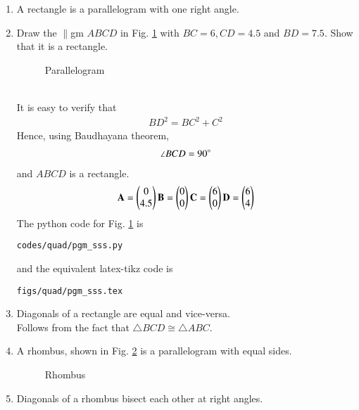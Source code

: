 \begin{enumerate}[label=\arabic*.,ref=\thesubsection.\theenumi]
\item A rectangle is a parallelogram with one right angle.
\item Draw the $\parallel$gm $ABCD$ in 	Fig. \ref{fig:pgm_sss}	
with $BC = 6, CD = 4.5$ and $BD=7.5$.  Show that it is a rectangle.
\label{const:pgm_sss}
%
\begin{figure}[!ht]
	\begin{center}
		\resizebox{\columnwidth}{!}{}
	\end{center}
	\caption{Parallelogram}
	\label{fig:pgm_sss}	
\end{figure}
\\
\solution It is easy to verify that 
%
\begin{align}
BD^2=BC^2+C^2
\end{align}
%
Hence, using Baudhayana theorem, 
%
\begin{align}
\angle BCD = 90\degree
\end{align}
%
and  $ABCD$ is a rectangle.
\begin{align}
\mathbf{A} = \begin{pmatrix}0\\4.5\end{pmatrix}
\mathbf{B} = \begin{pmatrix}0\\0\end{pmatrix}
\mathbf{C} = \begin{pmatrix}6\\0\end{pmatrix}
\mathbf{D} = \begin{pmatrix}6\\4\end{pmatrix}
\end{align}
%
The python code for  Fig. \ref{fig:pgm_sss} is
\begin{lstlisting}
codes/quad/pgm_sss.py
\end{lstlisting}
%
and the equivalent latex-tikz code is
%
\begin{lstlisting}
figs/quad/pgm_sss.tex
\end{lstlisting}
%
\item  Diagonals of a rectangle are equal and vice-versa. 
\\
\solution Follows from the fact that $\triangle BCD \cong \triangle ABC$. 
%
\item A rhombus, shown in Fig. 	\ref{fig:rhom_sss}	
 is a parallelogram with equal sides.  
%
\begin{figure}[!ht]
	\begin{center}
		\resizebox{\columnwidth}{!}{}
	\end{center}
	\caption{Rhombus}
	\label{fig:rhom_sss}	
\end{figure}
%
\item Diagonals of a rhombus bisect each other at right angles.

\end{enumerate}
